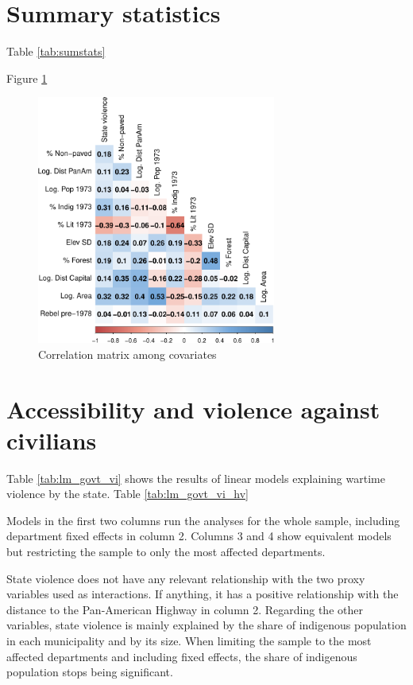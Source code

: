 \documentclass[a4paper, 12pt, notitlepage]{article}
\begin{document}
\clearpage
\section{Summary statistics}\label{app:stats}

Table \ref{tab:sumstats}

Figure \ref{fig:corrplot}



\begin{figure}[htb!]
  \centering
    \includegraphics[width = 0.7\textwidth]{img/corrplot}

  \caption{Correlation matrix among covariates} \label{fig:corrplot}

\end{figure}

\clearpage
\section{Accessibility and violence against civilians}\label{app:lm_violence}

\textbf{{\color{red}{SPECIFY TYPE OF DEPENDENT VARIABLE -- LOG FORM}}}


Table \ref{tab:lm_govt_vi} shows the results of linear models explaining wartime violence by the state.
Table \ref{tab:lm_govt_vi_hv}


Models in the first two columns run the analyses for the whole sample, including department fixed effects in column 2.
Columns 3 and 4 show equivalent models but restricting the sample to only the most affected departments.

State violence does not have any relevant relationship with the two proxy variables used as interactions.
If anything, it has a positive relationship with the distance to the Pan-American Highway in column 2.
Regarding the other variables, state violence is mainly explained by the share of indigenous population in each municipality and by its size.
When limiting the sample to the most affected departments and including fixed effects, the share of indigenous population stops being significant.
\end{document}
